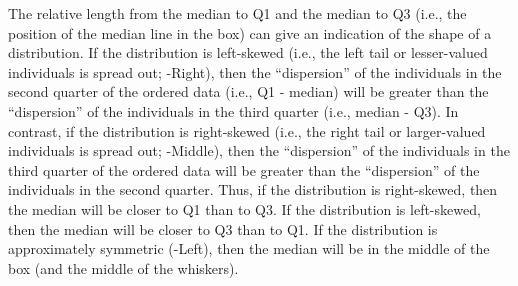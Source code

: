 \documentclass[10pt,openany]{book}\usepackage[]{graphicx}\usepackage[]{color}
\begin{document}
The relative length from the median to Q1 and the median to Q3 (i.e., the position of the median line in the box) can give an indication of the shape of a distribution.  If the distribution is left-skewed (i.e., the left tail or lesser-valued individuals is spread out; -Right), then the ``dispersion'' of the individuals in the second quarter of the ordered data (i.e., Q1 - median) will be greater than the ``dispersion'' of the individuals in the third quarter (i.e., median - Q3).  In contrast, if the distribution is right-skewed (i.e., the right tail or larger-valued individuals is spread out; -Middle), then the ``dispersion'' of the individuals in the third quarter of the ordered data will be greater than the ``dispersion'' of the individuals in the second quarter.  Thus, if the distribution is right-skewed, then the median will be closer to Q1 than to Q3.  If the distribution is left-skewed, then the median will be closer to Q3 than to Q1.  If the distribution is approximately symmetric (-Left), then the median will be in the middle of the box (and the middle of the whiskers).
\end{document}

